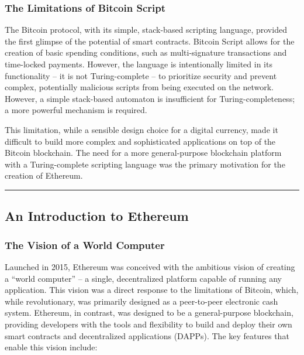 \subsubsection{The Limitations of Bitcoin
	Script}\label{the-limitations-of-bitcoin-script}

The Bitcoin protocol, with its simple, stack-based scripting language,
provided the first glimpse of the potential of smart contracts. Bitcoin
Script allows for the creation of basic spending conditions, such as
multi-signature transactions and time-locked payments. However, the
language is intentionally limited in its functionality -- it is not
Turing-complete -- to prioritize security and prevent complex,
potentially malicious scripts from being executed on the network. However, a simple stack-based automaton is insufficient
for Turing-completeness; a more powerful mechanism is required.

This limitation, while a sensible design choice for a digital currency,
made it difficult to build more complex and sophisticated applications
on top of the Bitcoin blockchain. The need for a more general-purpose
blockchain platform with a Turing-complete scripting language was the
primary motivation for the creation of Ethereum.

\begin{center}\rule{0.5\linewidth}{0.5pt}\end{center}

\subsection{An Introduction to
	Ethereum}\label{section-2-an-introduction-to-ethereum}

\subsubsection{The Vision of a World
	Computer}\label{the-vision-of-a-world-computer}

Launched in 2015, Ethereum was conceived with the ambitious vision of
creating a ``world computer'' -- a single, decentralized platform capable
of running any application. This vision was a direct response to the
limitations of Bitcoin, which, while revolutionary, was primarily
designed as a peer-to-peer electronic cash system. Ethereum, in
contrast, was designed to be a general-purpose blockchain, providing
developers with the tools and flexibility to build and deploy their own
smart contracts and decentralized applications (DAPPs).
The key features that enable this vision include:

